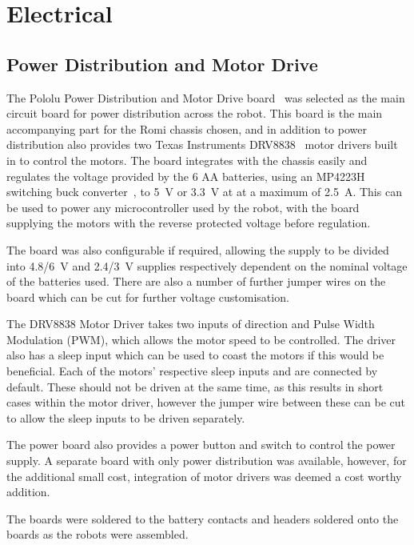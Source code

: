 
\chapter{Electrical}\label{electrical}

\section{Power Distribution and Motor Drive}\label{elec/poweranddrive}
The Pololu Power Distribution and Motor Drive board~\cite{pololupower} was selected as the main circuit board for power distribution across the robot. This board is the main accompanying part for the Romi chassis chosen, and in addition to power distribution also provides two Texas Instruments DRV8838~\cite{texasdrivers} motor drivers built in to control the motors. The board integrates with the chassis easily and regulates the voltage provided by the 6 AA batteries, using an MP4223H switching buck converter~\cite{mpbuck}, to \SI{5}{\volt} or \SI{3.3}{\volt} at at a maximum of \SI{2.5}{\ampere}. This can be used to power any microcontroller used by the robot, with the board supplying the motors with the reverse protected voltage before regulation. 

The board was also configurable if required, allowing the supply to be divided into \SI{4.8/6}{\volt} and \SI{2.4/3}{\volt} supplies respectively dependent on the nominal voltage of the batteries used. There are also a number of further jumper wires on the board which can be cut for further voltage customisation. 

The DRV8838 Motor Driver takes two inputs of direction and Pulse Width Modulation (PWM), which allows the motor speed to be controlled. The driver also has a sleep input which can be used to coast the motors if this would be beneficial. Each of the motors' respective sleep inputs and are connected by default. These should not be driven at the same time, as this results in short cases within the motor driver, however the jumper wire between these can be cut to allow the sleep inputs to be driven separately. 

The power board also provides a power button and switch to control the power supply. A separate board with only power distribution was available, however, for the additional small cost, integration of motor drivers was deemed a cost worthy addition. 

The boards were soldered to the battery contacts and headers soldered onto the boards as the robots were assembled. 
